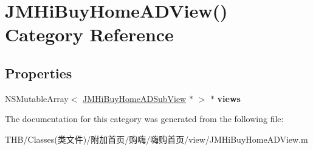\hypertarget{category_j_m_hi_buy_home_a_d_view_07_08}{}\section{J\+M\+Hi\+Buy\+Home\+A\+D\+View() Category Reference}
\label{category_j_m_hi_buy_home_a_d_view_07_08}
\subsection*{Properties}
\begin{DoxyCompactItemize}
\item 
\mbox{\label{category_j_m_hi_buy_home_a_d_view_07_08_ae29970f7b4b69caba034376c7a585c7e}} 
N\+S\+Mutable\+Array$<$ \mbox{\hyperlink{interface_j_m_hi_buy_home_a_d_sub_view}{J\+M\+Hi\+Buy\+Home\+A\+D\+Sub\+View}} $\ast$ $>$ $\ast$ {\bfseries views}
\end{DoxyCompactItemize}


The documentation for this category was generated from the following file\+:\begin{DoxyCompactItemize}
\item 
T\+H\+B/\+Classes(类文件)/附加首页/购嗨/嗨购首页/view/J\+M\+Hi\+Buy\+Home\+A\+D\+View.\+m\end{DoxyCompactItemize}
